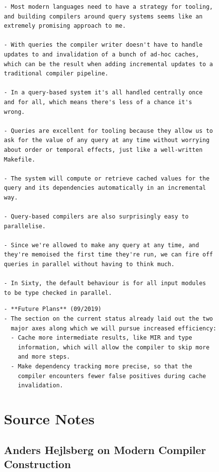 \documentclass[12pt, a4paper]{report}
\begin{document}
\begin{verbatim}
- Most modern languages need to have a strategy for tooling,
and building compilers around query systems seems like an
extremely promising approach to me.

- With queries the compiler writer doesn't have to handle
updates to and invalidation of a bunch of ad-hoc caches,
which can be the result when adding incremental updates to a
traditional compiler pipeline.

- In a query-based system it's all handled centrally once
and for all, which means there's less of a chance it's
wrong.

- Queries are excellent for tooling because they allow us to
ask for the value of any query at any time without worrying
about order or temporal effects, just like a well-written
Makefile.

- The system will compute or retrieve cached values for the
query and its dependencies automatically in an incremental
way.

- Query-based compilers are also surprisingly easy to
parallelise.

- Since we're allowed to make any query at any time, and
they're memoised the first time they're run, we can fire off
queries in parallel without having to think much.

- In Sixty, the default behaviour is for all input modules
to be type checked in parallel.
\end{verbatim}
\cite{olle_query_based}

\begin{verbatim}
- **Future Plans** (09/2019)
- The section on the current status already laid out the two
  major axes along which we will pursue increased efficiency:
  - Cache more intermediate results, like MIR and type
    information, which will allow the compiler to skip more
    and more steps.
  - Make dependency tracking more precise, so that the
    compiler encounters fewer false positives during cache
    invalidation.
\end{verbatim}
\cite{rust_blog_incremental_compilation}

\section*{Source Notes}

\subsection*{Anders Hejlsberg on Modern Compiler Construction}
\end{document}
